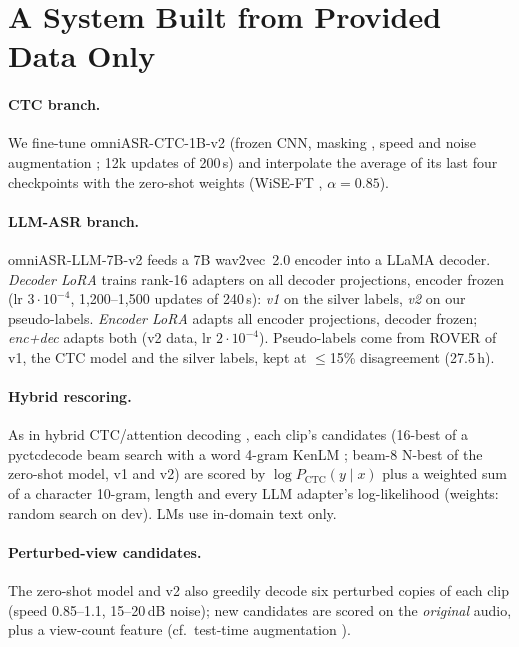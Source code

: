 \documentclass[runningheads]{llncs}
\begin{document}
\section{A System Built from Provided Data Only}\label{sec:system}
\paragraph{CTC branch.} We fine-tune omniASR-CTC-1B-v2 (frozen CNN, masking \cite{park2019specaugment},
speed and noise augmentation \cite{ko2015augment}; 12k updates of 200\,s) and interpolate the average of its last four checkpoints
with the zero-shot weights (WiSE-FT \cite{wortsman2022wiseft},
$\alpha{=}0.85$).

\paragraph{LLM-ASR branch.} omniASR-LLM-7B-v2 feeds a 7B wav2vec~2.0 encoder
\cite{baevski2020wav2vec} into a LLaMA decoder. \emph{Decoder LoRA} trains rank-16 adapters
\cite{hu2022lora} on all decoder projections, encoder frozen (lr $3{\cdot}10^{-4}$,
1{,}200--1{,}500 updates of 240\,s): \emph{v1} on the silver labels, \emph{v2} on our
pseudo-labels. \emph{Encoder LoRA} adapts all encoder projections, decoder frozen;
\emph{enc+dec} adapts both (v2 data, lr $2{\cdot}10^{-4}$). Pseudo-labels come from ROVER \cite{fiscus1997rover} of v1,
the CTC model and the silver labels, kept at $\le$15\% disagreement (27.5\,h).

\paragraph{Hybrid rescoring.} As in hybrid CTC/attention decoding \cite{watanabe2017hybrid}, each
clip's candidates (16-best of a pyctcdecode beam search with a word 4-gram KenLM \cite{heafield2011kenlm};
beam-8 N-best of the zero-shot model, v1 and v2) are scored by $\log P_{\mathrm{CTC}}(y\mid x)$
plus a weighted sum of a character 10-gram, length and every LLM adapter's log-likelihood
(weights: random search on dev). LMs use in-domain text only.

\paragraph{Perturbed-view candidates.} The zero-shot model and v2 also greedily decode six
perturbed copies of each clip (speed 0.85--1.1, 15--20\,dB noise); new candidates are scored on
the \emph{original} audio, plus a view-count feature (cf.\ test-time augmentation
\cite{jelea2025gtta}).
\end{document}
